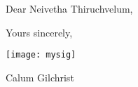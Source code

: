 
\setlength{\parskip}{0.5em}

Dear Neivetha Thiruchvelum,






\bigskip
Yours sincerely,

\texttt{[image: mysig]}

Calum Gilchrist

